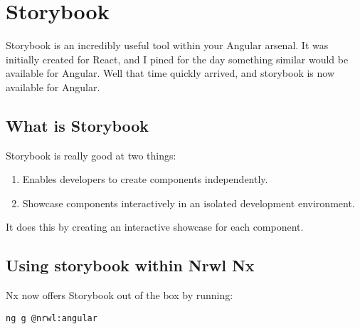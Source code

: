 \chapter{Storybook}
Storybook is an incredibly useful tool within your Angular arsenal. It was initially created for React, and I pined for the day something similar would be available for Angular. Well that time quickly arrived, and storybook is now available for Angular. 

\section{What is Storybook}
Storybook is really good at two things:
\begin{enumerate}
  \item Enables developers to create components independently. 
  \item Showcase components interactively in an isolated development environment.
\end{enumerate}

It does this by creating an interactive showcase for each component. 

\section{Using storybook within Nrwl Nx}
Nx now offers Storybook out of the box by running: 
\begin{lstlisting}
ng g @nrwl:angular  
\end{lstlisting}


